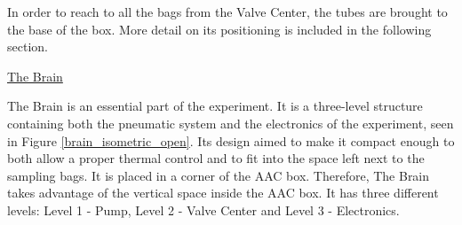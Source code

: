 \documentclass[a4paper,12pt,twoside]{article}
\begin{document}


In order to reach to all the bags from the Valve Center, the tubes are brought to the base of the box. More detail on its positioning is included in the following section. 


\bigskip
\underline{The Brain}
\label{subsec:brain}

\smallskip
The Brain is an essential part of the experiment. It is a three-level structure containing both the pneumatic system and the electronics of the experiment, seen in Figure \ref{brain_isometric_open}. Its design aimed to make it compact enough to both allow a proper thermal control and to fit into the space left next to the sampling bags. It is placed in a corner of the AAC box. Therefore, The Brain takes advantage of the vertical space inside the AAC box. It has three different levels: Level 1 - Pump, Level 2 - Valve Center and Level 3 - Electronics.
\end{document}
